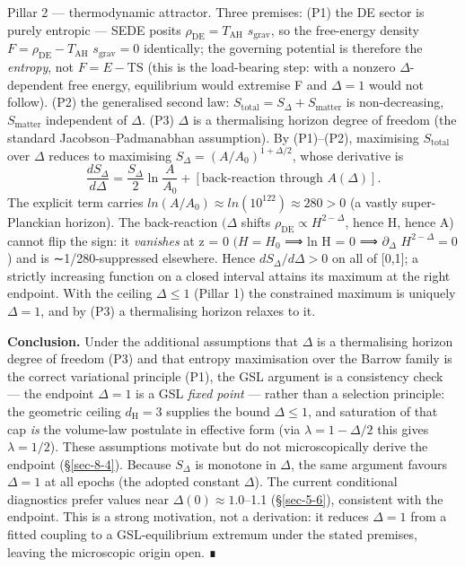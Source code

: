 \documentclass[preprint,12pt]{elsarticle}
\begin{document}
Pillar 2 --- thermodynamic attractor. Three premises: (P1) the DE sector
is purely entropic --- SEDE posits \(\rho _\mathrm{DE} = T_\mathrm{AH}\)
\(s_{\mathrm{grav}}\), so the free-energy density
\(F = \rho _\mathrm{DE} - T_\mathrm{AH}\) \(s_{\mathrm{grav}} = 0\)
identically; the governing potential is therefore the \emph{entropy},
not \(F = E - \mathrm{TS}\) (this is the load-bearing step: with a
nonzero \(\Delta\)-dependent free energy, equilibrium would extremise F
and \(\Delta  = 1\) would not follow). (P2) the generalised second law:
\(S_{\mathrm{total}} = S_\Delta  + S_{\mathrm{matter}}\) is
non-decreasing, \(S_{\mathrm{matter}}\) independent of \(\Delta\). (P3)
\(\Delta\) is a thermalising horizon degree of freedom (the standard
Jacobson--Padmanabhan assumption). By (P1)--(P2), maximising
\(S_{\mathrm{total}}\) over \(\Delta\) reduces to maximising
\(S_\Delta  = (A/A_{0})^{1+\Delta /2}\), whose derivative is
\begin{equation}\frac{dS_\Delta}{d\Delta} = \frac{S_\Delta}{2}\ln\!\frac{A}{A_0} + [\text{back-reaction through }A(\Delta)].\end{equation}
The explicit term carries
\(ln(A/A_{0}) \approx  ln(10^{122}) \approx  280 > 0\) (a vastly
super-Planckian horizon). The back-reaction \((\Delta\) shifts
\(\rho _\mathrm{DE} \propto  H^{2-\Delta }\), hence H, hence A) cannot
flip the sign: it \emph{vanishes} at z = 0 \((H = H_{0}\) ⟹ ln H = 0 ⟹
\(\partial _\Delta\) \(H^{2-\Delta } = 0\)) and is ∼1/280-suppressed
elsewhere. Hence \(dS_\Delta /d\Delta  > 0\) on all of {[}0,1{]}; a
strictly increasing function on a closed interval attains its maximum at
the right endpoint. With the ceiling \(\Delta  \leq  1\) (Pillar 1) the
constrained maximum is uniquely \(\Delta  = 1\), and by (P3) a
thermalising horizon relaxes to it.

\textbf{Conclusion.} Under the additional assumptions that \(\Delta\) is
a thermalising horizon degree of freedom (P3) and that entropy
maximisation over the Barrow family is the correct variational principle
(P1), the GSL argument is a consistency check --- the endpoint
\(\Delta  = 1\) is a GSL \emph{fixed point} --- rather than a selection
principle: the geometric ceiling \(d_{\mathrm{H}} = 3\) supplies the
bound \(\Delta  \leq  1\), and saturation of that cap \emph{is} the
volume-law postulate in effective form (via \(\lambda  = 1 - \Delta /2\)
this gives \(\lambda  = 1/2\)). These assumptions motivate but do not
microscopically derive the endpoint (§\ref{sec-8-4}). Because
\(S_\Delta\) is monotone in \(\Delta\), the same argument favours
\(\Delta  = 1\) at all epochs (the adopted constant \(\Delta\)). The
current conditional diagnostics prefer values near
\(\Delta (0) \approx  1.0\)--1.1 (§\ref{sec-5-6}), consistent with the
endpoint. This is a strong motivation, not a derivation: it reduces
\(\Delta  = 1\) from a fitted coupling to a GSL-equilibrium extremum
under the stated premises, leaving the microscopic origin open. ∎
\end{document}

